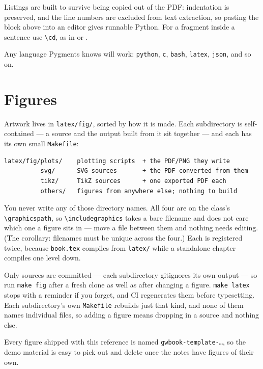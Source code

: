 \noindent
Listings are built to survive being copied out of the PDF: indentation is
preserved, and the line numbers are excluded from text extraction, so pasting
the block above into an editor gives runnable Python. For a fragment inside a
sentence use \verb|\cd|, as in  or .

Any language Pygments knows will work: \texttt{python}, \texttt{c},
\texttt{bash}, \texttt{latex}, \texttt{json}, and so on.

\section{Figures}

Artwork lives in \texttt{latex/fig/}, sorted by how it is made. Each
subdirectory is self-contained --- a source and the output built from it sit
together --- and each has its own small \texttt{Makefile}:

\begin{verbatim}
latex/fig/plots/    plotting scripts  + the PDF/PNG they write
          svg/      SVG sources       + the PDF converted from them
          tikz/     TikZ sources      + one exported PDF each
          others/   figures from anywhere else; nothing to build
\end{verbatim}

\noindent
You never write any of those directory names. All four are on the class's
\verb|\graphicspath|, so \verb|\includegraphics| takes a bare filename and does
not care which one a figure sits in --- move a file between them and nothing
needs editing. (The corollary: filenames must be unique across the four.) Each
is registered twice, because \texttt{book.tex} compiles from \texttt{latex/}
while a standalone chapter compiles one level down.

Only sources are committed --- each subdirectory gitignores its own output ---
so run \verb|make fig| after a fresh clone as well as after changing a figure.
\verb|make latex| stops with a reminder if you forget, and CI regenerates them
before typesetting. Each subdirectory's own \texttt{Makefile} rebuilds just that
kind, and none of them names individual files, so adding a figure means dropping
in a source and nothing else.

Every figure shipped with this reference is named
\texttt{gwbook-template-\ldots}, so the demo material is easy to pick out and
delete once the notes have figures of their own.

